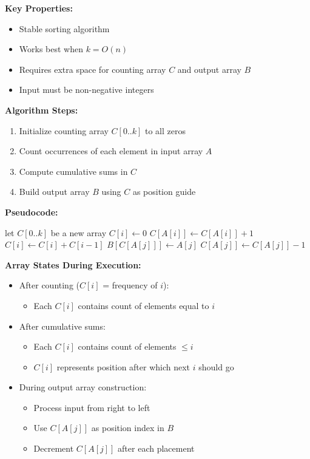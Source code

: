 \textbf{Key Properties:}
\begin{itemize}[noitemsep]
    \item Stable sorting algorithm
    \item Works best when $k = O(n)$
    \item Requires extra space for counting array $C$ and output array $B$
    \item Input must be non-negative integers
\end{itemize}

\textbf{Algorithm Steps:}
\begin{enumerate}[noitemsep]
    \item Initialize counting array $C[0..k]$ to all zeros
    \item Count occurrences of each element in input array $A$
    \item Compute cumulative sums in $C$
    \item Build output array $B$ using $C$ as position guide
\end{enumerate}

\textbf{Pseudocode:}
\begin{algorithmic}[1]
    \State let $C[0..k]$ be a new array
        \State $C[i] \gets 0$
    \EndFor
        \State $C[A[i]] \gets C[A[i]] + 1$
    \EndFor
        \State $C[i] \gets C[i] + C[i-1]$
    \EndFor
        \State $B[C[A[j]]] \gets A[j]$
        \State $C[A[j]] \gets C[A[j]] - 1$
    \EndFor
\EndFunction
\end{algorithmic}

\textbf{Array States During Execution:}
\begin{itemize}[noitemsep]
    \item After counting ($C[i]$ = frequency of $i$):
        \begin{itemize}[noitemsep]
            \item Each $C[i]$ contains count of elements equal to $i$
        \end{itemize}
    \item After cumulative sums:
        \begin{itemize}[noitemsep]
            \item Each $C[i]$ contains count of elements $\leq i$
            \item $C[i]$ represents position after which next $i$ should go
        \end{itemize}
    \item During output array construction:
        \begin{itemize}[noitemsep]
            \item Process input from right to left
            \item Use $C[A[j]]$ as position index in $B$
            \item Decrement $C[A[j]]$ after each placement
        \end{itemize}
\end{itemize}

